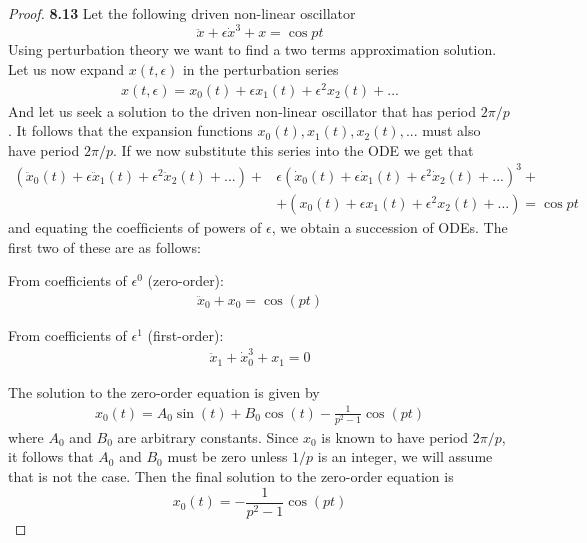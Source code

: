 \documentclass[11pt]{article}
\theoremstyle{definition}
\begin{document}
\cleardoublepage
    \begin{proof}{\textbf{8.13}}
        Let the following driven non-linear oscillator
        $$\ddot{x} + \epsilon\dot{x}^3 + x = \cos{pt}$$
        Using perturbation theory we want to find a two terms approximation
        solution. Let us now expand $x(t,\epsilon)$ in the perturbation series
        \begin{align*}
            x(t,\epsilon) = x_0(t) + \epsilon x_1(t) + \epsilon^2 x_2(t) + ...
        \end{align*}
        And let us seek a solution to the driven non-linear oscillator that has
        period $2\pi/p$. It follows that the expansion functions
        $x_0(t), x_1(t), x_2(t), ...$ must also have period $2\pi/p$. If we now
        substitute this series into the ODE we get that
        \begin{align*}
            (\ddot{x}_0(t) + \epsilon \ddot{x}_1(t) + \epsilon^2 \ddot{x}_2(t) + ...) +& 
            \epsilon(\dot{x}_0(t) + \epsilon \dot{x}_1(t) + \epsilon^2 \dot{x}_2(t) + ...)^3 +\\
            & + (x_0(t) + \epsilon x_1(t) + \epsilon^2 x_2(t) + ...) = \cos pt
        \end{align*}
        and equating the coefﬁcients of powers of $\epsilon$, we obtain a
        succession of ODEs. The ﬁrst two of these are as follows:

        From coefficients of $\epsilon^0$ (zero-order):
        \begin{align*}
            \ddot{x}_0 + x_0 = \cos(pt) 
        \end{align*}

        From coefficients of $\epsilon^1$ (first-order):
        \begin{align*}
            \ddot{x}_1 + \dot{x}_0^3 + x_1 = 0 
        \end{align*}

        The solution to the zero-order equation is given by
        \begin{align*}
            x_0(t) = A_0\sin(t) + B_0\cos(t) - \frac{1}{p^2 -1 }\cos(pt)
        \end{align*}
        where $A_0$ and $B_0$ are arbitrary constants. Since $x_0$ is known to
        have period $2\pi/p$, it follows that $A_0$ and $B_0$ must be zero
        unless $1/p$ is an integer, we will assume that is not the case. Then
        the final solution to the zero-order equation is
        $$x_0(t) = - \frac{1}{p^2 -1 }\cos(pt)$$


\end{proof}
\end{document}
